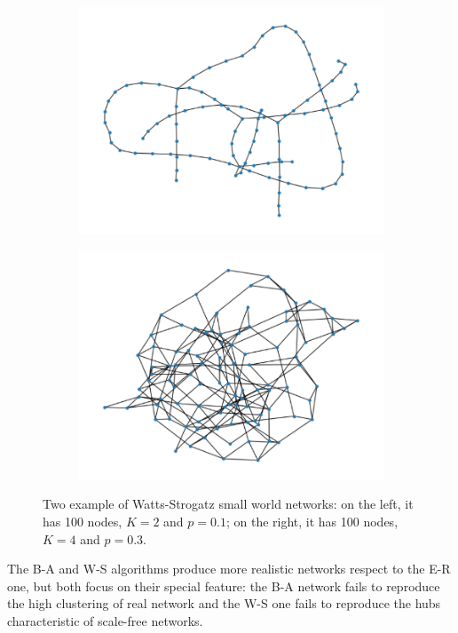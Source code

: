 \begin{figure}[ht!]
    \centering
    \begin{subfigure}[t]{0.49\textwidth}
        \centering
        \includegraphics[width=\linewidth]{image/W_S_N100_K2_p0,1.png}
    \end{subfigure}
    \hfill
    \begin{subfigure}[t]{0.49\textwidth}
        \centering
        \includegraphics[width=\linewidth]{image/W_S_N100_K4_p0,3.png}
    \end{subfigure}
    \caption{Two example of Watts-Strogatz small world networks: on the left, it has 100 nodes, $K=2$ and $p=0.1$; on the right, it has 100 nodes, $K=4$ and $p=0.3$.}
    \label{W-S_example}
\end{figure}

The B-A and W-S algorithms produce more realistic networks respect to the E-R one, but both focus on their special feature: the B-A network fails to reproduce the high clustering of real network and the W-S one fails to reproduce the hubs  characteristic of scale-free networks.